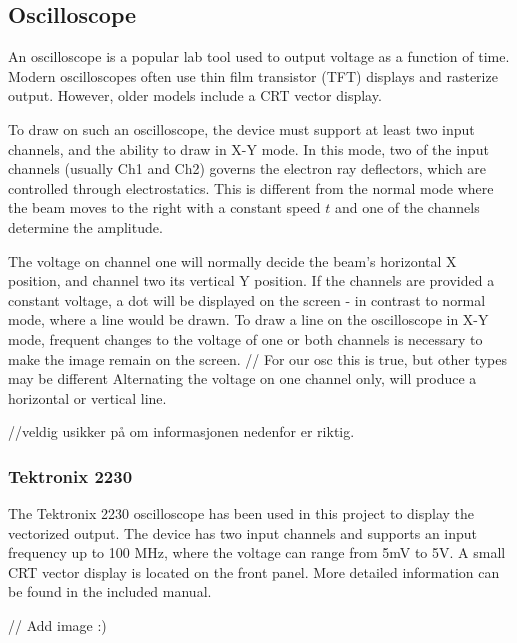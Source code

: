 \subsection{Oscilloscope}
An oscilloscope is a popular lab tool used to output voltage as a function of time.
Modern oscilloscopes often use thin film transistor (TFT) displays and rasterize output. 
However, older models include a CRT vector display.

To draw on such an oscilloscope, the device must support at least two input channels, and the ability to draw in X-Y mode.
In this mode, two of the input channels (usually Ch1 and Ch2) governs the electron ray deflectors, which are controlled through electrostatics. 
This is different from the normal mode where the beam moves to the right with a constant speed \( t \) and one of the channels determine the amplitude.

The voltage on channel one will normally decide the beam's horizontal X position, and channel two its vertical Y position.
If the channels are provided a constant voltage, a dot will be displayed on the screen - in contrast to normal mode, where a line would be drawn.
To draw a line on the oscilloscope in X-Y mode, frequent changes to the voltage of one or both channels is necessary to make the image remain on the screen. // For our osc this is true, but other types may be different
Alternating the voltage on one channel only, will produce a horizontal or vertical line.

//veldig usikker på om informasjonen nedenfor er riktig.

\subsubsection{Tektronix 2230}
The Tektronix 2230 oscilloscope has been used in this project to display the vectorized output.
The device has two input channels and supports an input frequency up to 100 MHz, where the voltage can range from 5mV to 5V.
A small CRT vector display is located on the front panel.
More detailed information can be found in the included manual\cite{tektronix2230}.

// Add image :)


